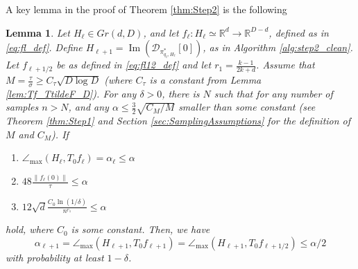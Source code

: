 \documentclass[12pt]{article}
\newtheorem{Lemma}[Theorem]{Lemma}
\theoremstyle{remark}
\newcommand{\RR}{\mathbb{R}}
\newcommand{\DD}{\mathcal{D}}
\newcommand{\maxangle}{\angle_{\max}}
\DeclareMathOperator{\Ima}{Im}
\begin{document}
A key lemma in the proof of Theorem \ref{thm:Step2} is the following

\begin{Lemma} \label{lem:main_support_theorem_step2}
    Let $H_\ell\in Gr(d, D)$, and let $f_\ell:H_\ell\simeq\RR^d \rightarrow \RR^{D-d}$, defined as in \eqref{eq:fl_def}. Define $H_{\ell+1} = \Ima(\DD_{\pi^*_{q_\ell,H_{\ell}}}[0])$, as in Algorithm \ref{alg:step2_clean}. Let $f_{\ell+1/2}$ be as defined in \eqref{eq:fl12_def} and let $r_1 = \frac{k-1}{2k +d}$. Assume that $M = \frac{\tau}{\sigma} \geq C_\tau \sqrt{D\log D}$ (where $C_\tau$ is a constant from Lemma \ref{lem:Tf_TtildeF_D}).
    For any $\delta>0$, there is $N$ such that for any number of samples $n>N$, and any $\alpha \leq\frac{3}{2} \sqrt{C_M/M}$ smaller than some constant (see Theorem \ref{thm:Step1} and Section \ref{sec:SamplingAssumptions} for the definition of $M$ and $C_M$).  If
    \begin{enumerate}
        \item $\maxangle (H_\ell, T_0 f_\ell) = \alpha_\ell\leq \alpha$
        \item $48\frac{\|f_\ell(0)\|}{\tau} \leq \alpha$
        \item $ 12\sqrt{d} \frac{C_0 \ln(1/\delta)}{n^{r_1}}\leq \alpha $ 
    \end{enumerate}
    hold, where $C_0$ is some constant. Then, we have  
    \[
    \alpha_{\ell+1} = \maxangle (H_{\ell+1}, T_0 f_{\ell+1})  = \maxangle (H_{\ell+1}, T_0 f_{\ell+1/2}) \leq \alpha/2
    \]
    with probability at least $1-\delta$.
\end{Lemma}
\end{document}
